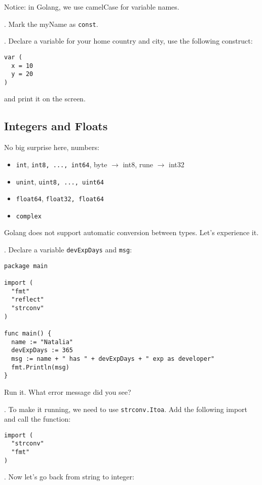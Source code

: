 \documentclass[11pt, letterpaper]{article}
\begin{document}
Notice: in Golang, we use camelCase for variable names.

. Mark the myName as \verb|const|. 

. Declare a variable for your home country and city, use the following construct:

\begin{verbatim}
var (
  x = 10
  y = 20
)
\end{verbatim}

and print it on the screen.

\subsection{Integers and Floats}

No big surprise here, numbers:

\begin{itemize}
\item \verb|int|, \verb|int8, ..., int64|, byte $\rightarrow$ int8, rune $\rightarrow$ int32
\item \verb|unint|, \verb|uint8, ..., uint64|
\item \verb|float64|, \verb|float32, float64|
\item \verb|complex|
\end{itemize}

Golang does not support automatic conversion between types. Let's experience it.

. Declare a variable \texttt{devExpDays} and \texttt{msg}:

\begin{verbatim}
package main

import (
  "fmt"
  "reflect"
  "strconv"
)

func main() {
  name := "Natalia"
  devExpDays := 365
  msg := name + " has " + devExpDays + " exp as developer"
  fmt.Println(msg)
}
\end{verbatim}

Run it. What error message did you see?

. To make it running, we need to use \texttt{strconv.Itoa}. Add the following import and call the function:

\begin{verbatim}
import (
  "strconv"
  "fmt"
)
\end{verbatim}

. Now let's go back from string to integer:
\end{document}
